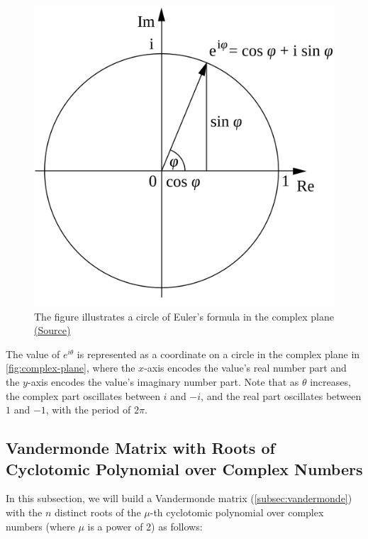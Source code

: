 \begin{figure}[!h]
    \centering
  \includegraphics[width=0.4\linewidth]{figures/euler-formula.png}
  \caption{The figure illustrates a circle of Euler's formula in the complex plane \href{https://en.wikipedia.org/wiki/Euler's_formula}{(Source)}}
\end{figure}

The value of $e^{i\theta}$ is represented as a coordinate on a circle in the complex plane in \autoref{fig:complex-plane}, where the $x$-axis encodes the value's real number part and the $y$-axis encodes the value's imaginary number part. Note that as $\theta$ increases, the complex part oscillates between $i$ and $-i$, and the real part oscillates between $1$ and $-1$, with the period of $2\pi$. 


\subsection{Vandermonde Matrix with Roots of Cyclotomic Polynomial over Complex Numbers}
\label{subsec:vandermonde-euler}

 
 
In this subsection, we will build a Vandermonde matrix (\autoref{subsec:vandermonde}) with the $n$ distinct roots of the $\mu$-th cyclotomic polynomial over complex numbers (where $\mu$ is a power of 2) as follows:



